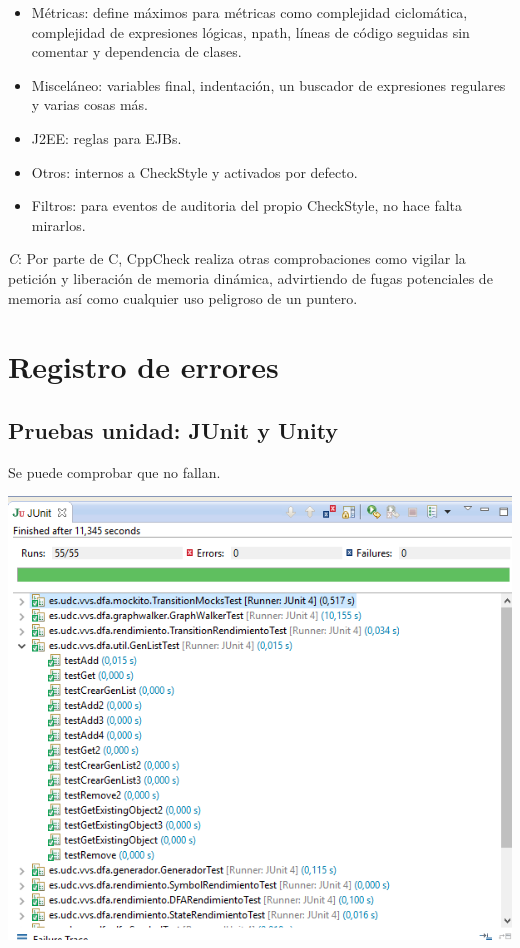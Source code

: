 \documentclass[DIV=calc,paper=a4,fontsize=11pt,onecolumn]{scrartcl} %
\begin{document}
\begin{itemize}
	\item Métricas: define máximos para métricas como complejidad ciclomática, complejidad de expresiones lógicas, npath, líneas de código seguidas sin comentar y dependencia de clases.
	\item Misceláneo: variables final, indentación, un buscador de expresiones regulares y varias cosas más.
	\item J2EE: reglas para EJBs.
	\item Otros: internos a CheckStyle y activados por defecto.
	\item Filtros: para eventos de auditoria del propio CheckStyle, no hace falta mirarlos.
\end{itemize}	


\textit{C}: Por parte de C, CppCheck realiza otras comprobaciones como vigilar la petición y liberación de memoria dinámica, advirtiendo de fugas potenciales de memoria así como cualquier uso peligroso de un puntero.


\section{Registro de errores}
\subsection{Pruebas unidad: JUnit y Unity}
Se puede comprobar que no fallan.

\includegraphics[width=15cm]{Imagenes/junit.png} \\
\end{document}

